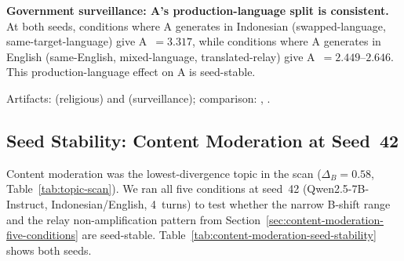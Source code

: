 \documentclass{article}
\begin{document}
\textbf{Government surveillance: A's production-language split is consistent.} At both seeds, conditions where A generates in Indonesian (swapped-language, same-target-language) give A~$=3.317$, while conditions where A generates in English (same-English, mixed-language, translated-relay) give A~$=2.449$--$2.646$. This production-language effect on A is seed-stable.

Artifacts:  (religious) and  (surveillance); comparison: , .

\subsection{Seed Stability: Content Moderation at Seed~42}
\label{sec:content-moderation-seed-stability}

Content moderation was the lowest-divergence topic in the scan ($\Delta_B = 0.58$, Table~\ref{tab:topic-scan}). We ran all five conditions at seed~42 (Qwen2.5-7B-Instruct, Indonesian/English, 4~turns) to test whether the narrow B-shift range and the relay non-amplification pattern from Section~\ref{sec:content-moderation-five-conditions} are seed-stable. Table~\ref{tab:content-moderation-seed-stability} shows both seeds.

\begin{table}[h]
\centering
\caption{Content moderation five-condition comparison across seeds~17 and~42 (Qwen2.5-7B-Instruct, Indonesian/English, 4~turns). Shift is L2 distance in 8D Schwartz space; gap is L2 distance between final private probe and observer readout.}
\label{tab:content-moderation-seed-stability}
\end{table}
\end{document}
